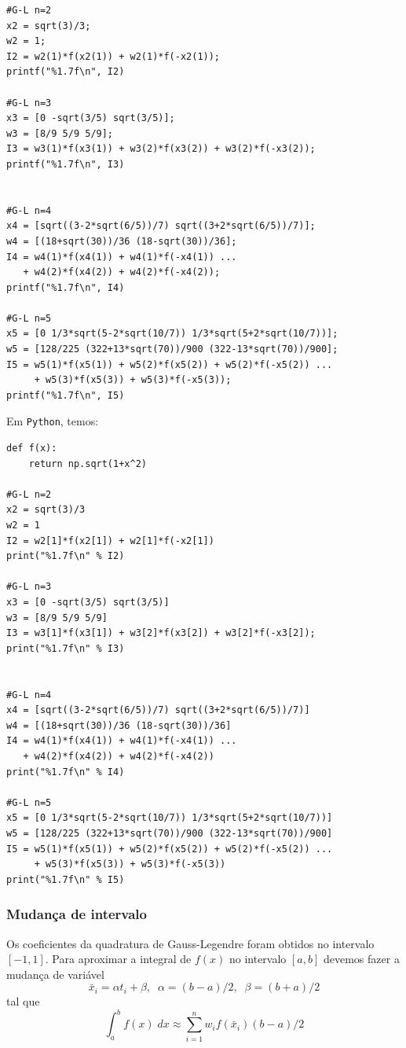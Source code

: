 \begin{sol}
\begin{verbatim}
#G-L n=2
x2 = sqrt(3)/3;
w2 = 1;
I2 = w2(1)*f(x2(1)) + w2(1)*f(-x2(1));
printf("%1.7f\n", I2)

#G-L n=3
x3 = [0 -sqrt(3/5) sqrt(3/5)];
w3 = [8/9 5/9 5/9];
I3 = w3(1)*f(x3(1)) + w3(2)*f(x3(2)) + w3(2)*f(-x3(2));
printf("%1.7f\n", I3)


#G-L n=4
x4 = [sqrt((3-2*sqrt(6/5))/7) sqrt((3+2*sqrt(6/5))/7)];
w4 = [(18+sqrt(30))/36 (18-sqrt(30))/36];
I4 = w4(1)*f(x4(1)) + w4(1)*f(-x4(1)) ...
   + w4(2)*f(x4(2)) + w4(2)*f(-x4(2));
printf("%1.7f\n", I4)

#G-L n=5
x5 = [0 1/3*sqrt(5-2*sqrt(10/7)) 1/3*sqrt(5+2*sqrt(10/7))];
w5 = [128/225 (322+13*sqrt(70))/900 (322-13*sqrt(70))/900];
I5 = w5(1)*f(x5(1)) + w5(2)*f(x5(2)) + w5(2)*f(-x5(2)) ...
     + w5(3)*f(x5(3)) + w5(3)*f(-x5(3));
printf("%1.7f\n", I5)
\end{verbatim}
\fi
\ifispython
Em \verb+Python+, temos:
\begin{verbatim}
def f(x):
    return np.sqrt(1+x^2)

#G-L n=2
x2 = sqrt(3)/3
w2 = 1
I2 = w2[1]*f(x2[1]) + w2[1]*f(-x2[1])
print("%1.7f\n" % I2)

#G-L n=3
x3 = [0 -sqrt(3/5) sqrt(3/5)]
w3 = [8/9 5/9 5/9]
I3 = w3[1]*f(x3[1]) + w3[2]*f(x3[2]) + w3[2]*f(-x3[2]);
print("%1.7f\n" % I3)


#G-L n=4
x4 = [sqrt((3-2*sqrt(6/5))/7) sqrt((3+2*sqrt(6/5))/7)]
w4 = [(18+sqrt(30))/36 (18-sqrt(30))/36]
I4 = w4(1)*f(x4(1)) + w4(1)*f(-x4(1)) ...
   + w4(2)*f(x4(2)) + w4(2)*f(-x4(2))
print("%1.7f\n" % I4)

#G-L n=5
x5 = [0 1/3*sqrt(5-2*sqrt(10/7)) 1/3*sqrt(5+2*sqrt(10/7))]
w5 = [128/225 (322+13*sqrt(70))/900 (322-13*sqrt(70))/900]
I5 = w5(1)*f(x5(1)) + w5(2)*f(x5(2)) + w5(2)*f(-x5(2)) ...
     + w5(3)*f(x5(3)) + w5(3)*f(-x5(3))
print("%1.7f\n" % I5)
\end{verbatim}
\fi
\end{sol}

\subsubsection{Mudança de intervalo}
Os coeficientes da quadratura de Gauss-Legendre foram obtidos no intervalo $[-1,1]$. Para aproximar a integral de $f(x)$ no intervalo $[a,b]$ devemos fazer a mudança de variável
$$ \bar{x}_i=\alpha t_i+ \beta , \;\; \alpha =(b-a)/2, \;\; \beta = (b+a)/2 $$
tal que
$$
 \int_{a}^{b} f(x) \; dx \approx \sum_{i=1}^n w_i f( \bar{x}_i ) (b-a)/2
$$

